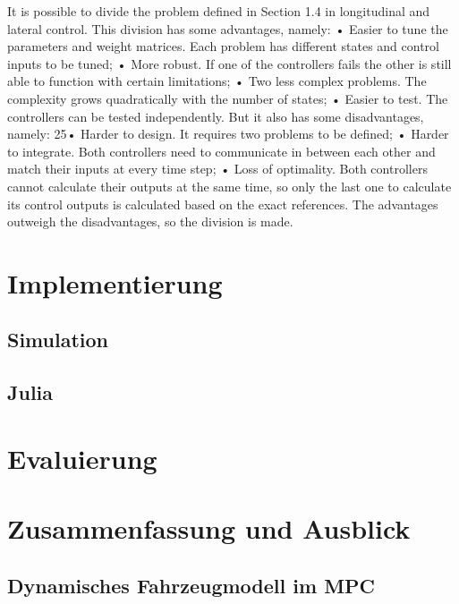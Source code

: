 \documentclass{like}
\begin{document}
It is possible to divide the problem defined in Section 1.4 in longitudinal and lateral control. This division has
some advantages, namely:
• Easier to tune the parameters and weight matrices. Each problem has different states and control inputs to
be tuned;
• More robust. If one of the controllers fails the other is still able to function with certain limitations;
• Two less complex problems. The complexity grows quadratically with the number of states;
• Easier to test. The controllers can be tested independently.
But it also has some disadvantages, namely:
25• Harder to design. It requires two problems to be defined;
• Harder to integrate. Both controllers need to communicate in between each other and match their inputs at
every time step;
• Loss of optimality. Both controllers cannot calculate their outputs at the same time, so only the last one to
calculate its control outputs is calculated based on the exact references.
The advantages outweigh the disadvantages, so the division is made.

\chapter{Implementierung}

\section{Simulation}

\section{Julia}


\chapter{Evaluierung}

\chapter[Zusammenfassung]{Zusammenfassung und Ausblick}
\section{Dynamisches Fahrzeugmodell im MPC}



\appendix





%



%


\end{document}
